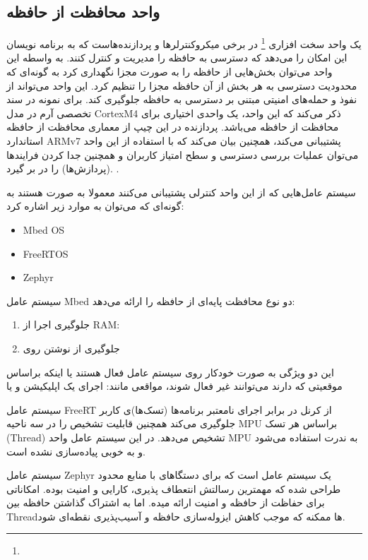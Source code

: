 \documentclass[10pt, a4paper]{article}
\begin{document}
\subsection{واحد محافظت از حافظه}

یک واحد سخت افزاری \footnote{} در برخی میکروکنترلر‌ها
و پردازنده‌هاست که به برنامه نویسان این امکان را می‌دهد که دسترسی به حافظه را
مدیریت و کنترل کنند. به واسطه این واحد می‌توان بخش‌هایی از حافظه را به صورت مجزا
نگهداری کرد به گونه‌ای که محدودیت دسترسی به هر بخش‌ از آن حافظه مجزا را تنظیم
کرد. این واحد می‌تواند از نفوذ و حمله‌های امنیتی مبتنی بر دسترسی به حافظه
جلوگیری کند. برای نمونه در سند تخصصی آرم در مدل CortexM4 ذکر می‌کند که این واحد،
یک واحدی اختیاری برای محافظت از حافظه می‌باشد. پردازنده در این چیپ از معماری
محافظت از حافظه استاندارد ARMv7 پشتیبانی می‌کند، همچنین بیان می‌کند که با
استفاده از این واحد می‌توان عملیات بررسی دسترسی و سطح امتیاز کاربران و همچنین
جدا کردن فرایندها (پردازش‌ها) را در بر گیرد. \cite{cortexm4arm}.

سیستم عامل‌هایی که از این واحد کنترلی پشتیبانی می‌کنند معمولا به صورت  هستند به گونه‌ای‌ که می‌توان به موارد زیر اشاره کرد:

\begin{itemize}
    \item Mbed OS
    \item FreeRTOS
    \item Zephyr
\end{itemize}

سیستم عامل Mbed دو نوع محافظت پایه‌ای از حافظه را ارائه می‌دهد:

\begin{enumerate}
    \item جلوگیری اجرا از RAM: 
    \item جلوگیری از نوشتن روی 
\end{enumerate}

این دو ویژگی به صورت خودکار روی سیستم عامل فعال هستند یا اینکه براساس موقعیتی که
دارند می‌توانند غیر فعال شوند، مواقعی مانند: اجرای یک اپلیکیشن و یا 

سیستم عامل FreeRT از کرنل در برابر اجرای نامعتبر برنامه‌ها (تسک‌ها)ی کاربر
جلوگیری می‌کند همچنین قابلیت تشخیص  را در سه ناحیه MPU براساس
هر تسک (Thread) تشخیص می‌دهد. در این سیستم عامل واحد MPU به ندرت استفاده می‌شود
و به خوبی پیاده‌سازی نشده است.

سیستم عامل Zephyr یک سیستم عامل  است که برای دستگاهای با منابع
محدود طراحی شده که مهمترین رسالتش انتعطاف پذیری، کارایی و امنیت بوده. امکاناتی
برای حفاظت از حافظه و امنیت ارائه میده. اما به اشتراک گذاشتن حافظه بین Threadها
ممکنه که موجب کاهش ایزوله‌سازی حافظه و آسیب‌پذیری نقطه‌ای شود.
\end{document}
